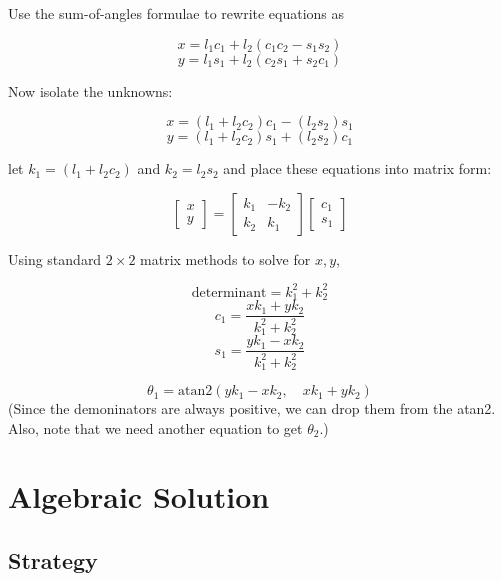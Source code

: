 Use the sum-of-angles formulae to rewrite equations as

\[
x = l_1c_1 + l_2(c_1c_2 -s_1s_2)
\]
\[
y = l_1s_1 + l_2(c_2s_1 + s_2c_1)
\]

Now isolate the unknowns:

\[
x = (l_1+l_2c_2)c_1 - (l_2s_2)s_1
\]
\[
y = (l_1+l_2c_2)s_1 + (l_2s_2)c_1
\]


let $k_1 = (l_1+l_2c_2)$ and $k_2 = l_2s_2$ and place these equations into matrix form:

\[
\begin{bmatrix} x \\ y \end{bmatrix} =
\begin{bmatrix} k_1  & -k_2 \\ k_2 & k_1 \end{bmatrix}
\begin{bmatrix} c_1 \\ s_1   \end{bmatrix}
\]

Using standard $2\times2$ matrix methods to solve for $x,y$,

\[
\mathrm{determinant} = k_1^2 +k_2^2
\]
\[
c_1 = \frac {xk_1+yk_2}  {k_1^2 +k_2^2}
\]
\[
s_1 = \frac {yk_1-xk_2}  {k_1^2 +k_2^2}
\]

\[
\theta_1 = \mathrm{atan2}(yk_1-xk_2, \quad xk_1+yk_2)
\]
(Since the demoninators are always positive, we can drop them from the atan2. Also, note that
we need another equation to get $\theta_2$.)









\section{Algebraic Solution}

\subsection{Strategy}

